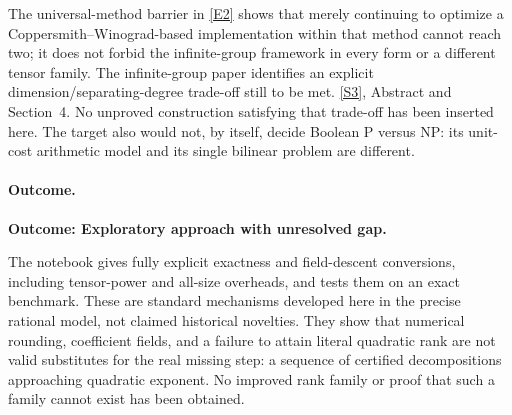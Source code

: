 \documentclass[11pt,a4paper]{article}
\newcommand{\sref}[2]{\hyperlink{source:#1:#2}{[S#2]}}
\newcommand{\eref}[2]{\hyperlink{extra:#1:#2}{[E#2]}}
\numberwithin{equation}{section}
\begin{document}
The universal-method barrier in \eref{3100086}{2} shows that merely continuing
to optimize a Coppersmith--Winograd-based implementation within that
method cannot reach two; it does not forbid the infinite-group framework
in every form or a different tensor family. The infinite-group paper
identifies an explicit dimension/separating-degree trade-off still to be
met. \sref{3100086}{3}, Abstract and Section~4. No unproved construction
satisfying that trade-off has been inserted here. The target also would
not, by itself, decide Boolean P versus NP: its unit-cost arithmetic
model and its single bilinear problem are different.

\paragraph{Outcome.}
\textbf{Outcome: Exploratory approach with unresolved gap.}

The notebook gives fully explicit exactness and field-descent conversions,
including tensor-power and all-size overheads, and tests them on an exact
benchmark. These are standard mechanisms developed here in the precise
rational model, not claimed historical novelties. They show that numerical
rounding, coefficient fields, and a failure to attain literal quadratic
rank are not valid substitutes for the real missing step: a sequence of
certified decompositions approaching quadratic exponent. No improved
rank family or proof that such a family cannot exist has been obtained.

\end{document}
